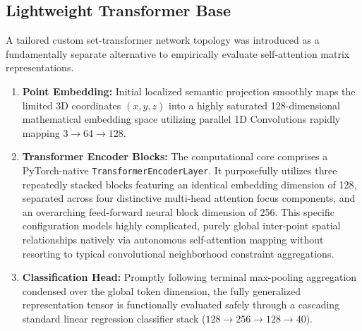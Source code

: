 \documentclass{article}
\begin{document}
\subsection{Lightweight Transformer Base}
A tailored custom set-transformer network topology was introduced as a fundamentally separate alternative to empirically evaluate self-attention matrix representations.
\begin{enumerate}
    \item \textbf{Point Embedding:} Initial localized semantic projection smoothly maps the limited 3D coordinates $(x,y,z)$ into a highly saturated 128-dimensional mathematical embedding space utilizing parallel 1D Convolutions rapidly mapping $3 \rightarrow 64 \rightarrow 128$.
    \item \textbf{Transformer Encoder Blocks:} The computational core comprises a PyTorch-native \texttt{TransformerEncoderLayer}. It purposefully utilizes three repeatedly stacked blocks featuring an identical embedding dimension of 128, separated across four distinctive multi-head attention focus components, and an overarching feed-forward neural block dimension of 256. This specific configuration models highly complicated, purely global inter-point spatial relationships natively via autonomous self-attention mapping without resorting to typical convolutional neighborhood constraint aggregations.
    \item \textbf{Classification Head:} Promptly following terminal max-pooling aggregation condensed over the global token dimension, the fully generalized representation tensor is functionally evaluated safely through a cascading standard linear regression classifier stack ($128 \rightarrow 256 \rightarrow 128 \rightarrow 40$).
\end{enumerate}
\end{document}

